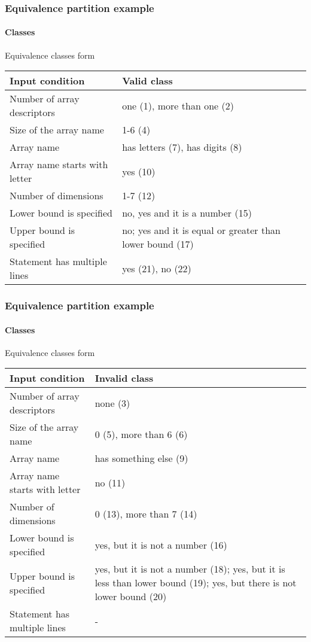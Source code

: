 \begin{frame}[hasprev=true, hasnext=true]
\frametitle{Equivalence partition example}
\framesubtitle{Classes}

\begin{block}{Equivalence classes form}
\begin{tabularx}{\textwidth}{|X|X|}
\textbf{Input condition}		& \textbf{Valid class}\\\hline
Number of array descriptors 	& one (1), more than one (2)\\\hline
Size of the array name			& 1-6 (4)\\\hline
Array name						& has letters (7), has digits (8)\\\hline
Array name starts with letter	& yes (10)\\\hline
Number of dimensions			& 1-7 (12)\\\hline
Lower bound is specified		& no, yes and it is a number (15)\\\hline
Upper bound is specified		& no;  yes and it is equal or greater than lower bound (17)\\\hline
Statement has multiple lines	& yes (21), no (22)\\
\end{tabularx}
\end{block}
\end{frame}




\begin{frame}[hasprev=true, hasnext=true]
\frametitle{Equivalence partition example}
\framesubtitle{Classes}

\begin{block}{Equivalence classes form}
\begin{tabularx}{\textwidth}{|X|X|}
\textbf{Input condition}		& \textbf{Invalid class}\\\hline
Number of array descriptors 	&  none (3) \\\hline
Size of the array name			&  0 (5), more than 6 (6)\\\hline
Array name						&  has something else (9)\\\hline
Array name starts with letter	&  no (11)\\\hline
Number of dimensions			&  0 (13), more than 7 (14)\\\hline
Lower bound is specified		&  yes, but it is not a number (16)\\\hline
Upper bound is specified		&  yes, but it is not a number (18); yes, but it is less than lower bound (19); yes, but there is not lower bound (20)\\\hline
Statement has multiple lines	&  -\\
\end{tabularx}
\end{block}
\end{frame}




